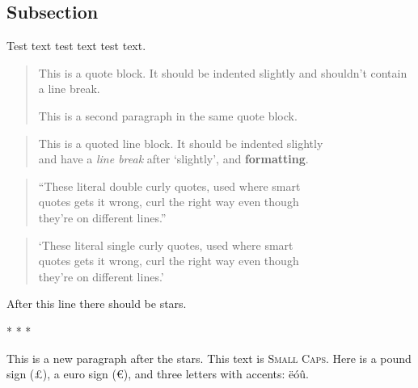 \documentclass[
  12pt,
  a4paper,
]{article}
\begin{document}
\hypertarget{__h2_1}{%
\subsection{Subsection}\label{__h2_1}}

\makeatletter
\@afterindentfalse
\@afterheading
\makeatother

Test text test text test text.

\begin{quote}
This is a quote block. It should be indented slightly and shouldn't
contain a line break.

This is a second paragraph in the same quote block.
\end{quote}

\begin{quote}
This is a quoted line block. It should be indented slightly\\
and have a \emph{line break} after `slightly', and \textbf{formatting}.
\end{quote}

\begin{quote}
``These literal double curly quotes, used where smart\\
quotes gets it wrong, curl the right way even though\\
they're on different lines.''
\end{quote}

\begin{quote}
`These literal single curly quotes, used where smart\\
quotes gets it wrong, curl the right way even though\\
they're on different lines.'
\end{quote}

\makeatletter
\@afterindentfalse
\@afterheading
\makeatother

After this line there should be stars.

\begin{center}* * *\end{center}

\makeatletter
\@afterindentfalse
\@afterheading
\makeatother

This is a new paragraph after the stars. This text is \textsc{Small
Caps}. Here is a pound sign (£), a euro sign (€), and three letters with
accents: ëóû.
\end{document}
